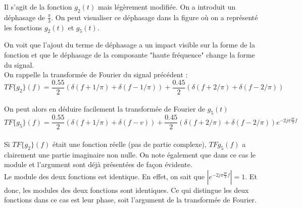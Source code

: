 \documentclass[11pt,a4paper]{article}
\begin{document}
Il s'agit de la fonction $g_2(t)$ mais légèrement modifiée. On a introduit un déphasage de $\frac{\pi}{3}$. On peut visualiser ce déphasage dans la figure où on a représenté les fonctions $g_2(t)$ et $g_5(t)$.\\


\begin{center}
\end{center}
On voit que l'ajout du terme de déphasage a un impact visible sur la forme de la fonction et que le déphasage de la composante "haute fréquence" change la forme du signal.\\

On rappelle la transformée de Fourier du signal précédent :\\

\[ TF\{ g_2 \}(f) =   \frac{0.55}{2}(\delta(f+1/\pi) + \delta(f-1/\pi)) + \frac{0.45}{2}(\delta(f+2/\pi) + \delta(f-2/\pi))\]\\

On peut alors en déduire facilement la transformée de Fourier de $g_5(t)$\\

\[ TF\{ g_5 \}(f) =   \frac{0.55}{2}(\delta(f+1/\pi) + \delta(f-v)) + \frac{0.45}{2}(\delta(f+2/\pi) + \delta(f-2/\pi))e^{-2 j \pi \frac{pi}{3} f }\]\\

Si $TF\{ g_2 \}(f)$ était une fonction réelle (pas de partie complexe), $TF{g_5}(f)$ a clairement une partie imaginaire non nulle. On note également que dans ce cas le module et l'argument sont déjà présentées de façon évidente.\\

Le module des deux fonctions est identique. En effet, on sait que $|e^{-2 j \pi \frac{pi}{3} f }|=1$. Et donc, les modules des deux fonctions sont identiques. Ce qui distingue les deux fonctions dans ce cas est leur phase, soit l'argument de la transformée de Fourier. \\
\end{document}
